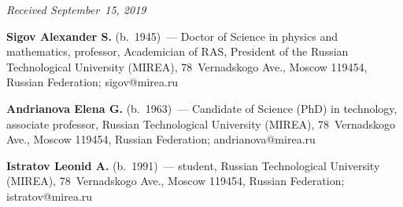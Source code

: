 \vspace*{-3pt}

  \hfill{\small\textit{Received September~15, 2019}}



\vspace*{-8pt}  


\Contr

\noindent
\textbf{Sigov Alexander S.} (b.\ 1945)~--- 
Doctor of Science in physics and mathematics, professor,
Academician of RAS, 
President of the Russian Technological University 
(MIREA),  78~Vernadskogo Ave., Moscow 119454, Russian Federation; 
\mbox{sigov@mirea.ru}

\vspace*{6pt}

\noindent
\textbf{Andrianova Elena G.} (b.\ 1963)~--- Candidate of Science (PhD) in technology, associate 
professor, Russian Technological University 
(MIREA),   78~Vernadskogo Ave., Moscow 119454, 
Russian Federation; andrianova@mirea.ru 





\vspace*{6pt}

\noindent
\textbf{Istratov Leonid A.} (b.\ 1991)~--- student, Russian Technological University 
(MIREA),  
78~Vernadskogo Ave., Moscow 119454, Russian Federation; \mbox{istratov@mirea.ru}
      
\label{end\stat}

\renewcommand{\bibname}{\protect\rm Литература}